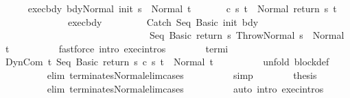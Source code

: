 \begin{isabellebody}
\ \ \ \ \isamarkupfalse%
\ exec{\isacharunderscore}bdy{\isacharcolon}\ {\isachardoublequoteopen}{\isasymGamma}{\isasymturnstile}{\isasymlangle}bdy{\isacharcomma}Normal\ {\isacharparenleft}init\ s{\isacharparenright}{\isasymrangle}\ {\isasymRightarrow}\ Normal\ t{\isachardoublequoteclose}\ \isanewline
\ \ \ \ \isamarkupfalse%
\ {\isachardoublequoteopen}{\isasymGamma}{\isasymturnstile}c\ s\ t\ {\isasymdown}\ Normal\ {\isacharparenleft}return\ s\ t{\isacharparenright}{\isachardoublequoteclose}\isanewline
\ \ \ \ \isamarkupfalse%
\ {\isacharminus}\isanewline
\ \ \ \ \ \ \isamarkupfalse%
\ exec{\isacharunderscore}bdy\ \isanewline
\ \ \ \ \ \ \isamarkupfalse%
\ {\isachardoublequoteopen}{\isasymGamma}{\isasymturnstile}{\isasymlangle}Catch\ {\isacharparenleft}Seq\ {\isacharparenleft}Basic\ init{\isacharparenright}\ bdy{\isacharparenright}\ \isanewline
\ \ \ \ \ \ \ \ \ \ \ \ \ \ \ \ \ \ \ \ \ \ \ \ \ \ \ \ \ \ \ {\isacharparenleft}Seq\ {\isacharparenleft}Basic\ {\isacharparenleft}return\ s{\isacharparenright}{\isacharparenright}\ Throw{\isacharparenright}{\isacharcomma}Normal\ s{\isasymrangle}\ {\isasymRightarrow}\ Normal\ t{\isachardoublequoteclose}\isanewline
\ \ \ \ \ \ \ \ \isamarkupfalse%
\ {\isacharparenleft}fastforce\ intro{\isacharcolon}\ exec{\isachardot}intros{\isacharparenright}\isanewline
\ \ \ \ \ \ \isamarkupfalse%
\ termi\ \isamarkupfalse%
\ {\isachardoublequoteopen}{\isasymGamma}{\isasymturnstile}DynCom\ {\isacharparenleft}{\isasymlambda}t{\isachardot}\ Seq\ {\isacharparenleft}Basic\ {\isacharparenleft}return\ s{\isacharparenright}{\isacharparenright}\ {\isacharparenleft}c\ s\ t{\isacharparenright}{\isacharparenright}\ {\isasymdown}\ Normal\ t{\isachardoublequoteclose}\isanewline
\ \ \ \ \ \ \ \ \isamarkupfalse%
\ {\isacharparenleft}unfold\ block{\isacharunderscore}def{\isacharparenright}\isanewline
\ \ \ \ \ \ \ \ \isamarkupfalse%
\ {\isacharparenleft}elim\ terminates{\isacharunderscore}Normal{\isacharunderscore}elim{\isacharunderscore}cases{\isacharparenright}\isanewline
\ \ \ \ \ \ \ \ \isamarkupfalse%
\ simp\isanewline
\ \ \ \ \ \ \isamarkupfalse%
\ {\isacharquery}thesis\isanewline
\ \ \ \ \ \ \ \ \isamarkupfalse%
\ {\isacharparenleft}elim\ terminates{\isacharunderscore}Normal{\isacharunderscore}elim{\isacharunderscore}cases{\isacharparenright}\isanewline
\ \ \ \ \ \ \ \ \isamarkupfalse%
\ {\isacharparenleft}auto\ intro{\isacharcolon}\ exec{\isachardot}intros{\isacharparenright}\isanewline

\end{isabellebody}

